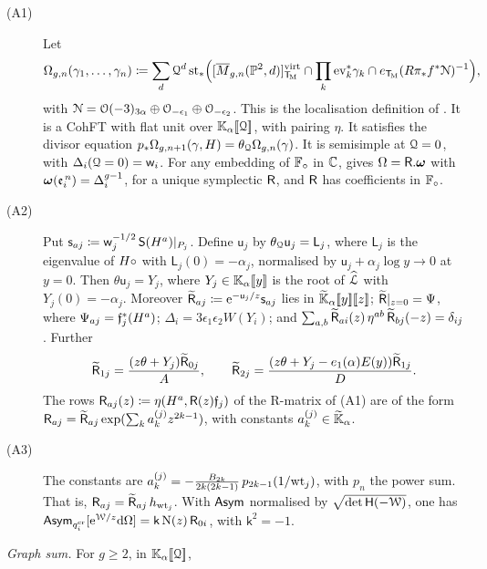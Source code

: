 \begin{thm}
\label{thm:gen-main}
\begin{description}
\item[(A1)] Let
\[
\Omega_{g,n}(\gamma_1,\dots,\gamma_n)\coloneqq\sum_{d}\mathcal{Q}^d\,\mathrm{st}_*\Big([\overline{M}_{g,n}(\mathbb{P}^2,d)]^{\mathrm{virt}}_{\mathsf{T}_{\!\mathrm{M}}}\cap\prod_k\mathrm{ev}_k^*\gamma_k\cap e_{\mathsf{T}_{\!\mathrm{M}}}(R\pi_*f^*\mathcal{N})^{-1}\Big),
\]
with $\mathcal{N}=\mathcal{O}(-3)_{3\alpha}\oplus\mathcal{O}_{-\epsilon_1}\oplus\mathcal{O}_{-\epsilon_2}$. This is the localisation definition of \cite{BS}. It is a CohFT with flat unit over $\mathbb{K}_{\alpha}[\![ \mathcal{Q} ]\!]$, with pairing $\eta$. It satisfies the divisor equation $p_*\Omega_{g,n+1}(\gamma,H)=\theta_{\mathcal{Q}}\Omega_{g,n}(\gamma)$. It is semisimple at $\mathcal{Q}=0$, with $\Delta_i(\mathcal{Q}=0)=\mathsf{w}_i$. For any embedding of $\mathbb{F}_{\circ}$ in $\mathbb{C}$, \cite[Theorem (2)]{Tel12} gives $\Omega=\mathsf{R}.\boldsymbol{\omega}$ with $\boldsymbol{\omega}(\mathfrak{e}_i^{\,n})=\Delta_i^{g-1}$, for a unique symplectic $\mathsf{R}$, and $\mathsf{R}$ has coefficients in $\mathbb{F}_{\circ}$.
\item[(A2)] Put $\mathsf{s}_{aj}\coloneqq\mathsf{w}_j^{-1/2}\,\mathsf{S}(H^a)|_{P_j}$. Define $\mathsf{u}_j$ by $\theta_{\mathcal{Q}}\mathsf{u}_j=\mathsf{L}_j$, where $\mathsf{L}_j$ is the eigenvalue of $H\circ$ with $\mathsf{L}_j(0)=-\alpha_j$, normalised by $\mathsf{u}_j+\alpha_j\log y\to 0$ at $y=0$. Then $\theta\mathsf{u}_j=Y_j$, where $Y_j\in\mathbb{K}_{\alpha}[\![ y ]\!]$ is the root of $\widehat{\mathcal{L}}$ with $Y_j(0)=-\alpha_j$. Moreover $\widetilde{\mathsf{R}}_{aj}\coloneqq\mathrm{e}^{-\mathsf{u}_j/z}\mathsf{s}_{aj}$ lies in $\widetilde{\mathbb{K}}_{\alpha}[\![ y ]\!][\![ z ]\!]$; $\widetilde{\mathsf{R}}|_{z=0}=\Psi$, where $\Psi_{aj}=\mathfrak{f}_j^*(H^a)$; $\Delta_i=3\epsilon_1\epsilon_2W(Y_i)$; and $\sum_{a,b}\widetilde{\mathsf{R}}_{ai}(z)\,\eta^{ab}\,\widetilde{\mathsf{R}}_{bj}(-z)=\delta_{ij}$. Further
\begin{equation}
\widetilde{\mathsf{R}}_{1j}=\frac{(z\theta+Y_j)\widetilde{\mathsf{R}}_{0j}}{A},\qquad \widetilde{\mathsf{R}}_{2j}=\frac{(z\theta+Y_j-e_1(\alpha)E(y))\widetilde{\mathsf{R}}_{1j}}{D}.
\label{eq:gen-rowrec}
\end{equation}
The rows $\mathsf{R}_{aj}(z)\coloneqq\eta(H^a,\mathsf{R}(z)\mathfrak{f}_j)$ of the R-matrix of \textup{(A1)} are of the form $\mathsf{R}_{aj}=\widetilde{\mathsf{R}}_{aj}\exp(\sum_k a_k^{(j)}z^{2k-1})$, with constants $a_k^{(j)}\in\widetilde{\mathbb{K}}_{\alpha}$.
\item[(A3)] The constants are $a_k^{(j)}=-\frac{B_{2k}}{2k(2k-1)}\,p_{2k-1}(1/\mathrm{wt}_j)$, with $p_n$ the power sum. That is, $\mathsf{R}_{aj}=\widetilde{\mathsf{R}}_{aj}\,h_{\mathrm{wt}_j}$. With $\mathsf{Asym}$ normalised by $\sqrt{\det\mathsf{H}(-\mathcal{W})}$, one has $\mathsf{Asym}_{q_i^{\mathrm{cr}}}[\mathrm{e}^{\mathcal{W}/z}\mathrm{d}\Omega]=\mathsf{k}\,\mathrm{N}(z)\,\mathsf{R}_{0i}$, with $\mathsf{k}^2=-1$.
\end{description}
\emph{Graph sum.} For $g\geq2$, in $\mathbb{K}_{\alpha}[\![ \mathcal{Q} ]\!]$,
\begin{multline}

\end{multline}
\end{thm}
